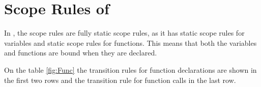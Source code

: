 \section{Scope Rules of \lang{}}
In \lang{}, the scope rules are fully static scope rules, as it has static scope rules for variables and static scope rules for functions. This means that both the variables and functions are bound when they are declared. 
\begin{comment}
\begin{table}[H]
    \begin{adjustbox}{center}
        \begin{tabular}{|c|c|}

\hline
\vspace {0.1pt}  &\\
PROC          &   \hbox{\huge \(\frac{env_V \vdash \langle D_P,\  env_P [p \mapsto (S,\  env_P)] \rangle \rightarrow_{DP} env'_P}{env_V \vdash \langle proc\ p\ is\ S;\ D_P,\ env_P \rangle \rightarrow_{DP} env'_P}\) } \vspace{0.1pt} \\ \hline 
\vspace {0.1pt} & \\  
PROC-EMPTY    & \hbox{\huge \(env_V \vdash \langle \varepsilon, env_P \rangle \rightarrow_{DP} env_P \)} \vspace {0.1pt} \\ \hline
\vspace {0.1pt} & \\ 
CALL-STAT-DYN & \hbox{\huge \(\frac{e'v[next \rightarrow e], e_p \vdash \langle S, \  st\rangle \rightarrow St'}{e_v , e_p \vdash \langle Call \  p, St \rangle \rightarrow St'} \ where \begin{aligned} e_p (p) = \langle S, e'_v \\ e = e_v (next) \end{aligned}\) } \vspace{0.1pt}  \\ \hline

        \end{tabular}
    \end{adjustbox}
    
    \caption{Caption}
    \label{fig:TrannyRulesProc}
\end{table}
\end{comment}
On the table \ref{fig:Func} the transition rules for function declarations are shown in the first two rows and the transition rule for function calls in the last row.


